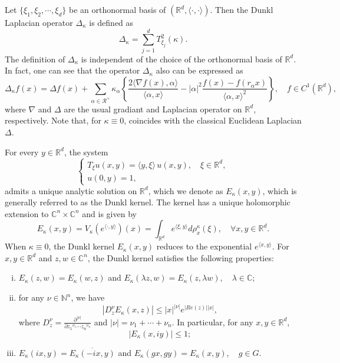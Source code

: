 \documentclass[a4paper,11pt, reqno]{amsart}
\theoremstyle{definition}
\theoremstyle{remark}
\numberwithin{equation}{section}
\begin{document}
	Let $\{\xi_1, \xi_2, \cdots, \xi_d\}$ be an orthonormal basis of $(\mathbb{R}^{d} , \langle \cdot, \cdot\rangle )$. Then  the Dunkl Laplacian operator $\Delta_\kappa $ is defined as $$\Delta_\kappa=\sum_{j=1}^dT^2_{\xi_j}(\kappa).$$
	The definition of  $\Delta_\kappa$ is independent of the choice of the orthonormal basis of $\mathbb{R}^{d}.$ In fact,   one can see that the operator $\Delta_\kappa $ also can be expressed as $$\Delta_\kappa f(x)=\Delta f(x)+\sum_{\alpha \in \mathcal{R}^+}\kappa_\alpha \left\{\frac{2 \langle \nabla f(x),  \alpha \rangle}{\langle \alpha, x\rangle } -|\alpha|^2 \frac{f(x)-f(r_\alpha x)}{\langle \alpha, x\rangle^2 } \right\}, \quad f\in C^1(\mathbb{R}^{d}),$$
	where $\nabla$ and $\Delta$ are    the usual gradiant  and   Laplacian operator on $\mathbb{R}^{d}$, respectively.  Note  that, for $\kappa \equiv 0$, coincides with the classical Euclidean Laplacian $\Delta$. 
	
	For every $y\in\mathbb{R}^{d}$, the system 
	\begin{equation*}
		\begin{cases}
			T_\xi u(x,y)=\langle y,\xi\rangle\, u(x,y), \quad \xi\in\mathbb{R}^{d},\\
			u(0,y)=1,
		\end{cases}
	\end{equation*}
	admits a unique analytic solution on $\mathbb{R}^{d}$, which we denote as  $E_\kappa(x,y)$, which is generally referred to as the Dunkl kernel. The kernel has a unique holomorphic extension to $\mathbb{C}^n\times \mathbb{C}^n$ and is given by
	\begin{equation*}
		E_\kappa(x,y)=V_\kappa(e^{\langle \cdot,y\rangle})(x)=\int_{\mathbb{R}^{d}}e^{\langle \xi,y\rangle}d\rho_x^\kappa(\xi),\quad \forall x,y\in\mathbb{R}^{d}.
	\end{equation*}
	When $\kappa \equiv 0$, the Dunkl kernel $E_\kappa(x,y)$  reduces to the exponential $e^{\langle x,y\rangle}$. For $x,y\in\mathbb{R}^{d}$ and  $z,w\in\mathbb{C}^n$, the Dunkl kernel satisfies the following properties:
	\begin{enumerate}[(i)]
		\item $E_\kappa(z,w)=E_\kappa(w,z)$ and $E_\kappa(\lambda z,w)=E_\kappa(z,\lambda w),\quad \lambda\in\mathbb{C}$;
		\item  for any $\nu\in\mathbb{N}^n$, we have
		$$|D_z^\nu E_\kappa(x,z)|\leq |x|^{|\nu|}e^{|Re(z)||x|},$$
		where $D_z^\nu=\frac{\partial^{|\nu|}}{\partial {z_1}^{\nu_1}\cdots {z_n}^{\nu_n}}$ and $|\nu|=\nu_1+\cdots+\nu_n$. In particular, for any $x,y\in\mathbb{R}^{d}$, 
		$$|E_\kappa(x,iy)|\leq 1;$$
		\item $E_\kappa(ix,y)=\overline{E_\kappa(-ix,y)}$ and $E_\kappa(gx,gy)=E_\kappa(x,y),\quad g\in G$.
	\end{enumerate}
	
\end{document}
